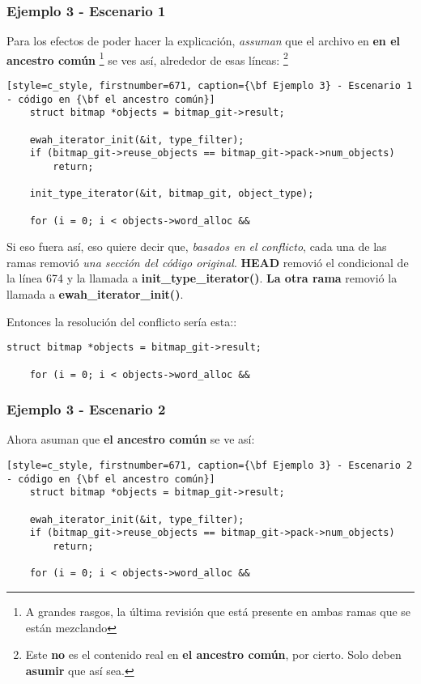 \subsubsection{Ejemplo 3 - Escenario 1}
Para los efectos de poder hacer la explicación, {\it assuman} que el archivo en {\bf en el ancestro común} \footnote{A grandes
rasgos, la última revisión que está presente en ambas ramas que se están mezclando} se ves así, alrededor de esas líneas:
\footnote{Este {\bf no} es el contenido real en {\bf el ancestro común}, por cierto. Solo deben {\bf asumir} que así sea.}

\begin{lstlisting}[style=c_style, firstnumber=671, caption={\bf Ejemplo 3} - Escenario 1 - código en {\bf el ancestro común}]
	struct bitmap *objects = bitmap_git->result;

	ewah_iterator_init(&it, type_filter);
	if (bitmap_git->reuse_objects == bitmap_git->pack->num_objects)
		return;

	init_type_iterator(&it, bitmap_git, object_type);

	for (i = 0; i < objects->word_alloc &&
\end{lstlisting}

Si eso fuera así, eso quiere decir que, {\it basados en el conflicto}, cada una de las ramas removió {\it una sección del
código original}. {\bf HEAD} removió el condicional de la línea 674 y la llamada a {\bf init\_type\_iterator()}. {\bf La
otra rama} removió la llamada a {\bf ewah\_iterator\_init()}.

Entonces la resolución del conflicto sería esta::
\begin{lstlisting}[style=c_style, firstnumber=671, caption={\bf Ejemplo 3} - Escenario 1 - resolución del conflicto]
	struct bitmap *objects = bitmap_git->result;

	for (i = 0; i < objects->word_alloc &&
\end{lstlisting}

\subsubsection{Ejemplo 3 - Escenario 2}
Ahora asuman que {\bf el ancestro común} se ve así:

\begin{lstlisting}[style=c_style, firstnumber=671, caption={\bf Ejemplo 3} - Escenario 2 - código en {\bf el ancestro común}]
	struct bitmap *objects = bitmap_git->result;

	ewah_iterator_init(&it, type_filter);
	if (bitmap_git->reuse_objects == bitmap_git->pack->num_objects)
		return;

	for (i = 0; i < objects->word_alloc &&
\end{lstlisting}

